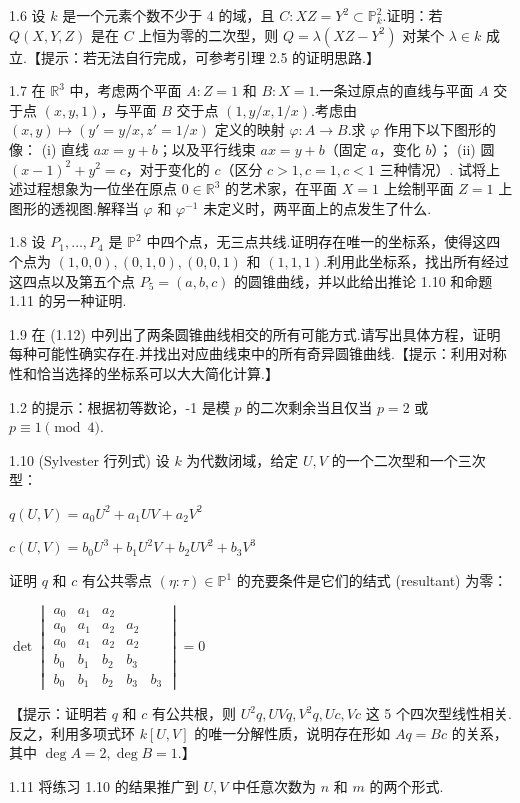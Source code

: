 1.6 设 \(k\) 是一个元素个数不少于 4 的域，且 \(C: XZ = Y^2 \subset \mathbb{P}_k^2\).证明：若 \(Q(X,Y,Z)\) 是在 \(C\) 上恒为零的二次型，则 \(Q = \lambda(XZ - Y^2)\) 对某个 \(\lambda \in k\) 成立.【提示：若无法自行完成，可参考引理 2.5 的证明思路.】

1.7 在 \(\mathbb{R}^3\) 中，考虑两个平面 \(A: Z=1\) 和 \(B: X=1\).一条过原点的直线与平面 \(A\) 交于点 \((x,y,1)\)，与平面 \(B\) 交于点 \((1, y/x, 1/x)\).考虑由 \((x,y) \mapsto (y' = y/x, z' = 1/x)\) 定义的映射 \(\varphi: A \to B\).求 \(\varphi\) 作用下以下图形的像：
(i) 直线 \(ax = y+b\)；以及平行线束 \(ax = y+b\)（固定 \(a\)，变化 \(b\)）；
(ii) 圆 \((x-1)^2 + y^2 = c\)，对于变化的 \(c\)（区分 \(c>1, c=1, c<1\) 三种情况）.
试将上述过程想象为一位坐在原点 \(0 \in \mathbb{R}^3\) 的艺术家，在平面 \(X=1\) 上绘制平面 \(Z=1\) 上图形的透视图.解释当 \(\varphi\) 和 \(\varphi^{-1}\) 未定义时，两平面上的点发生了什么.

1.8 设 \(P_1, \dots, P_4\) 是 \(\mathbb{P}^2\) 中四个点，无三点共线.证明存在唯一的坐标系，使得这四个点为 \((1,0,0), (0,1,0), (0,0,1)\) 和 \((1,1,1)\).利用此坐标系，找出所有经过这四点以及第五个点 \(P_5 = (a,b,c)\) 的圆锥曲线，并以此给出推论 1.10 和命题 1.11 的另一种证明.

1.9 在 (1.12) 中列出了两条圆锥曲线相交的所有可能方式.请写出具体方程，证明每种可能性确实存在.并找出对应曲线束中的所有奇异圆锥曲线.【提示：利用对称性和恰当选择的坐标系可以大大简化计算.】

1.2 的提示：根据初等数论，-1 是模 \(p\) 的二次剩余当且仅当 \(p=2\) 或 \(p \equiv 1 \pmod 4\).

1.10 (Sylvester 行列式) 设 \(k\) 为代数闭域，给定 \(U,V\) 的一个二次型和一个三次型：

\(
q(U,V) = a_0 U^2 + a_1 UV + a_2 V^2
\)

\(
c(U,V) = b_0 U^3 + b_1 U^2 V + b_2 UV^2 + b_3 V^3
\)

证明 \(q\) 和 \(c\) 有公共零点 \((\eta:\tau) \in \mathbb{P}^1\) 的充要条件是它们的结式 (resultant) 为零：

\(
\det \begin{vmatrix} a_0 & a_1 & a_2 & & \\ a_0 & a_1 & a_2 & a_2 & \\ a_0 & a_1 & a_2 & a_2 & \\ b_0 & b_1 & b_2 & b_3 & \\ b_0 & b_1 & b_2 & b_3 & b_3 \end{vmatrix} = 0
\)

【提示：证明若 \(q\) 和 \(c\) 有公共根，则 \(U^2q, UVq, V^2q, Uc, Vc\) 这 5 个四次型线性相关.反之，利用多项式环 \(k[U,V]\) 的唯一分解性质，说明存在形如 \(Aq = Bc\) 的关系，其中 \(\deg A = 2, \deg B = 1\).】

1.11 将练习 1.10 的结果推广到 \(U,V\) 中任意次数为 \(n\) 和 \(m\) 的两个形式.